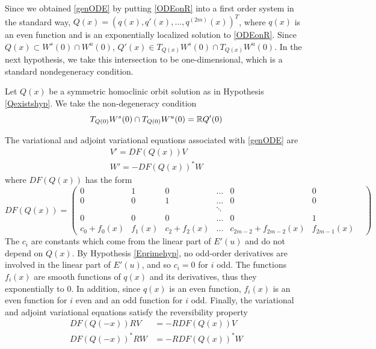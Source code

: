 \documentclass[thesis.tex]{subfiles}
\begin{document}
Since we obtained \eqref{genODE} by putting \eqref{ODEonR} into a first order system in the standard way, $Q(x) = (q(x), q'(x), \dots, q^{(2m)}(x))^T$, where $q(x)$ is an even function and is an exponentially localized solution to \eqref{ODEonR}. Since $Q(x) \subset W^s(0) \cap W^u(0)$, $Q'(x) \in T_{Q(x)}W^s(0) \cap T_{Q(x)}W^u(0)$. In the next hypothesis, we take this intersection to be one-dimensional, which is a standard nondegeneracy condition.

\begin{hypothesis}\label{nondegenhyp}
Let $Q(x)$ be a symmetric homoclinic orbit solution as in Hypothesis \ref{Qexistshyp}. We take the non-degeneracy condition
\begin{equation}
T_{Q(0)}W^s(0) \cap T_{Q(0)}W^u(0) = {\mathbb R} Q'(0)
\end{equation}
\end{hypothesis}

The variational and adjoint variational equations associated with \eqref{genODE} are
\begin{align}
V' = DF(Q(x)) V \label{vareq1} \\
W' = -DF(Q(x))^* W \label{adjvareq1}
\end{align}
where $DF(Q(x))$ has the form
\begin{equation}\label{DF}
DF(Q(x)) = \begin{pmatrix}
0 & 1 & 0 & \dots & 0 & 0 \\
0 & 0 & 1 & \dots & 0 & 0 \\
& &  & \ddots &  & & \\
0 & 0 & 0 & \dots & 0 & 1 \\
c_0 + f_0(x) & f_1(x) & c_2 + f_2(x) &
 \dots & c_{2m-2} + f_{2m-2}(x) & f_{2m-1}(x)
\end{pmatrix}
\end{equation}
The $c_i$ are constants which come from the linear part of $E'(u)$ and do not depend on $Q(x)$. By Hypothesis \ref{Eprimehyp}, no odd-order derivatives are involved in the linear part of $E'(u)$, and so $c_i = 0$ for $i$ odd. The functions $f_i(x)$ are smooth functions of $q(x)$ and its derivatives, thus they exponentially to 0. In addition, since $q(x)$ is an even function, $f_i(x)$ is an even function for $i$ even and an odd function for $i$ odd. Finally, the variational and adjoint variational equations satisfy the reversibility property 
\begin{equation}\label{vareqrev}
\begin{aligned}
DF(Q(-x))RV &= -R DF(Q(x)) V \\
DF(Q(-x))^* RW &= -R DF(Q(x))^* W
\end{aligned}
\end{equation}
\end{document}
